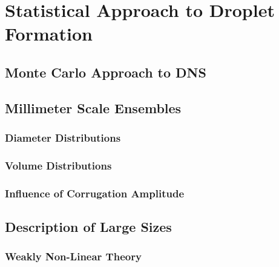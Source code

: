 \setchapterpreamble[u]{\margintoc}
\chapter{Statistical Approach to Droplet Formation}


\section{Monte Carlo Approach to DNS}



\section{Millimeter Scale Ensembles}


\subsection*{Diameter Distributions}






\subsection*{Volume Distributions}






\subsection*{Influence of Corrugation Amplitude}




\section{Description of Large Sizes}




\subsection*{Weakly Non-Linear Theory}



